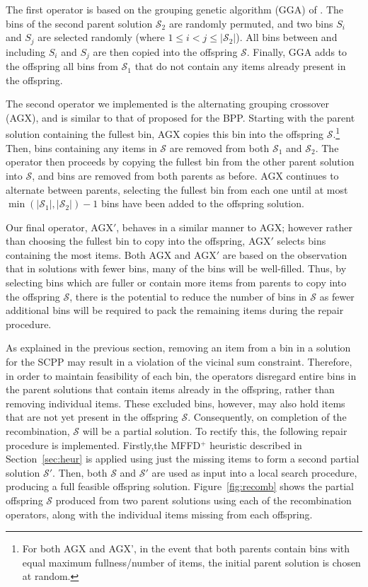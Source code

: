 \documentclass[authoryear]{elsarticle}
\begin{document}
The first operator is based on the grouping genetic algorithm (GGA) of \citet{falkenauer1992}. The bins of the second parent solution $\mathcal{S}_2$ are randomly permuted, and two bins $S_i$ and $S_j$ are selected randomly (where $1 \leq i < j \leq |\mathcal{S}_2|$). All bins between and including $S_i$ and $S_j$ are then copied into the offspring $\mathcal{S}$. Finally, GGA adds to the offspring all bins from $\mathcal{S}_1$ that do not contain any items already present in the offspring.

The second operator we implemented is the alternating grouping crossover (AGX), and is similar to that of \citet{quiroz2015} proposed for the BPP. Starting with the parent solution containing the fullest bin, AGX copies this bin into the offspring $\mathcal{S}$.\footnote{For both AGX and AGX', in the event that both parents contain bins with equal maximum fullness/number of items, the initial parent solution is chosen at random.} Then, bins containing any items in $\mathcal{S}$ are removed from both $\mathcal{S}_1$ and $\mathcal{S}_2$. The operator then proceeds by copying the fullest bin from the other parent solution into $\mathcal{S}$, and bins are removed from both parents as before. AGX continues to alternate between parents, selecting the fullest bin from each one until at most $\min (|\mathcal{S}_1|,|\mathcal{S}_2|) - 1$ bins have been added to the offspring solution.

Our final operator, AGX$'$, behaves in a similar manner to AGX; however rather than choosing the fullest bin to copy into the offspring, AGX$'$ selects bins containing the most items. Both AGX and AGX$'$ are based on the observation that in solutions with fewer bins, many of the bins will be well-filled. Thus, by selecting bins which are fuller or contain more items from parents to copy into the offspring $\mathcal{S}$, there is the potential to reduce the number of bins in $\mathcal{S}$ as fewer additional bins will be required to pack the remaining items during the repair procedure.

As explained in the previous section, removing an item from a bin in a solution for the SCPP may result in a violation of the vicinal sum constraint. Therefore, in order to maintain feasibility of each bin, the operators disregard entire bins in the parent solutions that contain items already in the offspring, rather than removing individual items. These excluded bins, however, may also hold items that are not yet present in the offspring $\mathcal{S}$. Consequently, on completion of the recombination, $\mathcal{S}$ will be a partial solution. To rectify this, the following repair procedure is implemented. Firstly,the MFFD$^+$ heuristic described in Section~\ref{sec:heur} is applied using just the missing items to form a second partial solution $\mathcal{S}'$. Then, both $\mathcal{S}$ and $\mathcal{S}'$ are used as input into a local search procedure, producing a full feasible offspring solution. Figure~\ref{fig:recomb} shows the partial offspring $\mathcal{S}$ produced from two parent solutions using each of the recombination operators, along with the individual items missing from each offspring.
\end{document}

